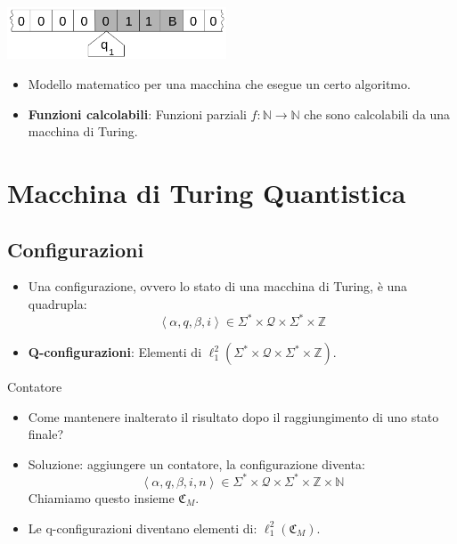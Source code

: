 \documentclass{beamer}
\begin{document}
\begin{frame}{\subsecname}{}
	\centering\includegraphics[width=6.5cm]{Turing_machine_2b.svg.png}
	\begin{itemize}
		\item Modello matematico per una macchina che esegue un certo algoritmo.
		\item \textbf{Funzioni calcolabili}: Funzioni parziali \( f : \mathbb{N} \rightarrow \mathbb{N} \) che sono calcolabili da una macchina di Turing.
	\end{itemize}
\end{frame}

\section{Macchina di Turing Quantistica}

\subsection{Configurazioni}

\begin{frame}{\subsecname}{}
	\begin{itemize}
		\item Una configurazione, ovvero lo stato di una macchina di Turing, è una quadrupla:
		\[ \left \langle \alpha, q, \beta, i \right \rangle \in \Sigma^{*} \times \mathcal{Q} \times \Sigma^{*} \times \mathbb{Z} \]
		\item \textbf{Q-configurazioni}: Elementi di \( \ell^{2}_{1} \left ( \Sigma^{*} \times \mathcal{Q} \times \Sigma^{*} \times \mathbb{Z} \right ) \).
	\end{itemize}
\end{frame}

\begin{frame}{\subsecname}{Contatore}
	\begin{itemize}
		\item Come mantenere inalterato il risultato dopo il raggiungimento di uno stato finale?
		\item Soluzione: aggiungere un contatore, la configurazione diventa:
		\[ \left \langle \alpha, q, \beta, i, n \right \rangle \in \Sigma^{*} \times \mathcal{Q} \times \Sigma^{*} \times \mathbb{Z} \times \mathbb{N} \]
		Chiamiamo questo insieme \(\mathfrak{C}_M\).
		\item Le q-configurazioni diventano elementi di: \( \ell^{2}_{1} \left ( \mathfrak{C}_M \right ) \).
	\end{itemize}
\end{frame}
\end{document}
